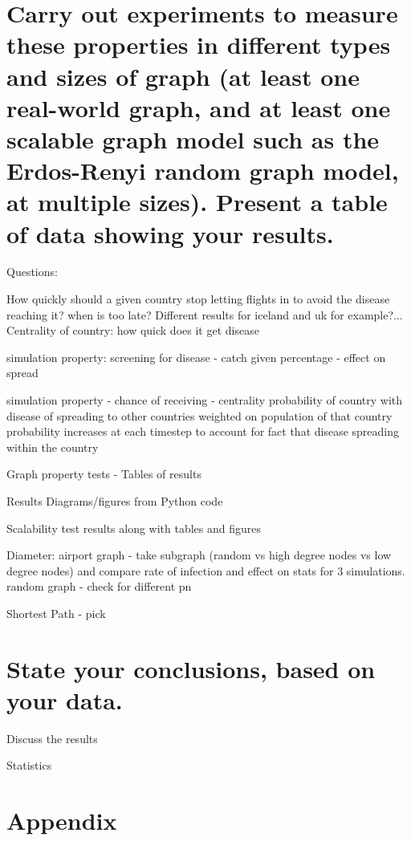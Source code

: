 \documentclass[a4paper,11pt]{article}
\begin{document}
\section{Carry out experiments to measure these properties in different types and sizes of graph (at least one real-world graph, and at least one scalable graph model such as the Erdos-Renyi random graph model, at multiple sizes). Present a table of data showing your results.}

Questions:

How quickly should a given country stop letting flights in to avoid the disease reaching it? when is too late? Different results for iceland and uk for example?...
Centrality of country: how quick does it get disease 

simulation property: screening for disease - catch given percentage -  effect on spread

simulation property - chance of receiving - centrality
probability of country with disease of spreading to other countries weighted on population of that country
probability increases at each timestep to account for fact that disease spreading within the country



Graph property tests - Tables of results

Results Diagrams/figures from Python code


Scalability  test results along with tables and figures

Diameter: airport graph - take subgraph (random vs high degree nodes vs low degree nodes) and compare rate of infection and effect on stats for 3 simulations. random graph - check for different pn

Shortest Path - pick 


\section{State your conclusions, based on your data.}

Discuss the results


Statistics

\clearpage
\section*{Appendix}



\clearpage


\end{document}

